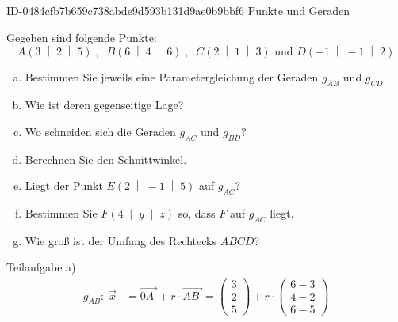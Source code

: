 \begin{exercise}
      {ID-0484cfb7b659c738abde9d593b131d9ae0b9bbf6}
      {Punkte und Geraden}
  \ifproblem\problem\par
    Gegeben sind folgende Punkte:
    \begin{equation*}
      A\left(\num{3}\;\middle|\;\num{2}\;\middle|\;\num{5}\right)
      \;,\;\;
      B\left(\num{6}\;\middle|\;\num{4}\;\middle|\;\num{6}\right)
      \;,\;\;
      C\left(\num{2}\;\middle|\;\num{1}\;\middle|\;\num{3}\right)
      \text{ und }
      D\left(-\num{1}\;\middle|\;-\num{1}\;\middle|\;\num{2}\right)
    \end{equation*}
    \begin{enumerate}[a)]
      \item Bestimmen Sie jeweils eine Parametergleichung
            der Geraden $g_{AB}$ und $g_{CD}$.
      \item Wie ist deren gegenseitige Lage?
      \item Wo schneiden sich die Geraden $g_{AC}$ und
            $g_{BD}$?
      \item Berechnen Sie den Schnittwinkel.
      \item Liegt der Punkt
            $E\left(\num{2}\;\middle|\;-\num{1}\;\middle|\;\num{5}\right)$
            auf $g_{AC}$?
      \item Bestimmen Sie
            $F\left(\num{4}\;\middle|\;y\;\middle|\;z\right)$
            so, dass $F$ auf $g_{AC}$ liegt.
      \item Wie groß ist der Umfang des Rechtecks $ABCD$?
    \end{enumerate}
  \fi
  \ifoutcome\outcome\par
    Teilaufgabe a)
    \begin{equation*}
    \begin{split}
    g_{AB}:\;\vec{x}
    &=\overrightarrow{0A\;}+r\cdot\overrightarrow{AB\;}
    =
    \begin{pmatrix}
      \num{3} \\
      \num{2} \\
      \num{5}
    \end{pmatrix}
    +r\cdot
    \begin{pmatrix}
      \num{6} - \num{3} \\
      \num{4} - \num{2} \\
      \num{6} - \num{5}
    \end{pmatrix}

\end{split}
\end{equation*}
\end{exercise}

